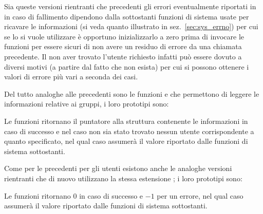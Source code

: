 Sia queste versioni rientranti che precedenti gli errori eventualmente
riportati in  in caso di fallimento dipendono dalla sottostanti
funzioni di sistema usate per ricavare le informazioni (si veda quanto
illustrato in sez.~\ref{sec:sys_errno}) per cui se lo si vuole utilizzare è
opportuno inizializzarlo a zero prima di invocare le funzioni per essere
sicuri di non avere un residuo di errore da una chiamata precedente. Il non
aver trovato l'utente richiesto infatti può essere dovuto a diversi motivi (a
partire dal fatto che non esista) per cui si possono ottenere i valori di
errore più vari a seconda dei casi.

Del tutto analoghe alle precedenti sono le funzioni  e
 che permettono di leggere le informazioni relative ai gruppi,
i loro prototipi sono:

\begin{funcproto}{
}

{Le funzioni ritornano il puntatore alla struttura contenente le informazioni
  in caso di successo e  nel caso non sia stato trovato nessun
  utente corrispondente a quanto specificato, nel qual caso 
  assumerà il valore riportato dalle funzioni di sistema sottostanti.}
\end{funcproto}

Come per le precedenti per gli utenti esistono anche le analoghe versioni
rientranti che di nuovo utilizzano la stessa estensione ; i loro
prototipi sono:

\begin{funcproto}{
}

{Le funzioni ritornano $0$ in caso di successo e $-1$ per un errore, nel qual
  caso  assumerà il valore riportato dalle funzioni di sistema
  sottostanti.}
\end{funcproto}

